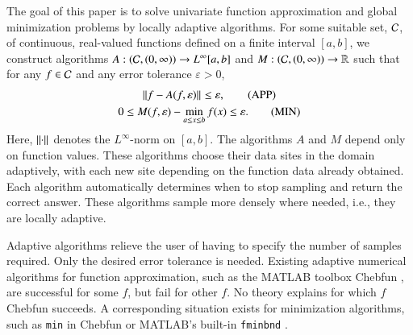 \documentclass[review]{elsarticle}
\newcommand{\abstol}{\varepsilon}
\theoremstyle{definition}
\begin{document}
The goal of this paper is to solve univariate function approximation and global minimization problems by locally adaptive algorithms. For some suitable set, $\mathcal{C}$, of continuous,
real-valued functions defined on a finite interval $[a,b]$, we  construct
algorithms $A:(\mathcal{C},(0,\infty)) \to L^{\infty}[a,b]$ and $M: (\mathcal{C},(0,\infty)) \to
\mathbb{R}$ such that for any $f \in \mathcal{C}$ and any error tolerance $\abstol > 0$,
\begin{gather}
\norm{f - A(f,\abstol)} \le \abstol,  \tag{APP} \label{appxprob} \\
0 \le M(f,\abstol) - \min_{a \le x \le b} f(x)  \le \abstol. \tag{MIN} \label{optprob}
\end{gather}
Here, $\left \lVert \cdot \right \rVert_{{}}$ denotes the $L^{\infty}$-norm on $[a,b]$.  The algorithms $A$ and $M$ depend only on function values. These algorithms choose their data sites in the domain adaptively, with each new site depending on the function data already obtained.  Each algorithm  automatically determines when to stop sampling
and return the correct answer.  These algorithms sample more densely where needed, i.e., they are locally adaptive.

Adaptive algorithms relieve the user of having to specify the number of samples required.  Only the desired error tolerance is needed.  Existing adaptive numerical algorithms for function approximation, such as the MATLAB toolbox Chebfun \citep{TrefEtal16a}, are successful for some $f$, but fail for other $f$.  No theory explains for which $f$ Chebfun succeeds.   A corresponding situation exists for minimization algorithms, such as \texttt{min} in Chebfun or MATLAB's built-in \texttt{fminbnd} \citep{MAT9.0}.
\end{document}
